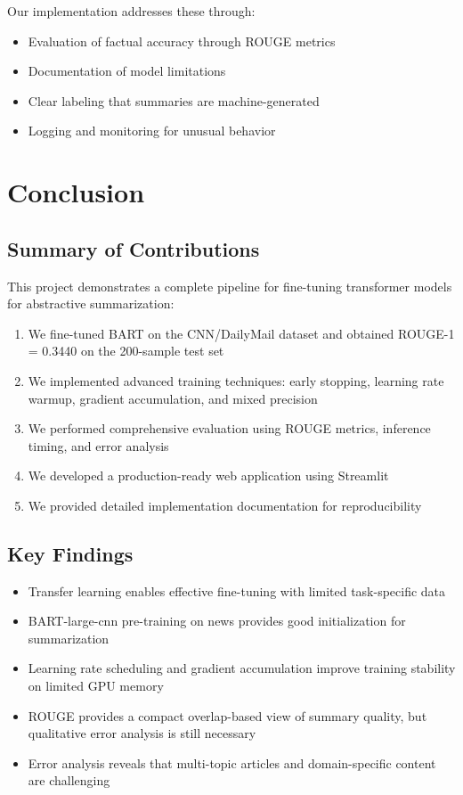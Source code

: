 \documentclass[12pt,a4paper,oneside]{report}
\begin{document}
Our implementation addresses these through:
\begin{itemize}
    \item Evaluation of factual accuracy through ROUGE metrics
    \item Documentation of model limitations
    \item Clear labeling that summaries are machine-generated
    \item Logging and monitoring for unusual behavior
\end{itemize}

\chapter{Conclusion}
\label{ch:conclusion}

\section{Summary of Contributions}
This project demonstrates a complete pipeline for fine-tuning transformer models for abstractive summarization:

\begin{enumerate}
    \item We fine-tuned BART on the CNN/DailyMail dataset and obtained ROUGE-1 = 0.3440 on the 200-sample test set
    \item We implemented advanced training techniques: early stopping, learning rate warmup, gradient accumulation, and mixed precision
    \item We performed comprehensive evaluation using ROUGE metrics, inference timing, and error analysis
    \item We developed a production-ready web application using Streamlit
    \item We provided detailed implementation documentation for reproducibility
\end{enumerate}

\section{Key Findings}
\begin{itemize}
    \item Transfer learning enables effective fine-tuning with limited task-specific data
    \item BART-large-cnn pre-training on news provides good initialization for summarization
    \item Learning rate scheduling and gradient accumulation improve training stability on limited GPU memory
    \item ROUGE provides a compact overlap-based view of summary quality, but qualitative error analysis is still necessary
    \item Error analysis reveals that multi-topic articles and domain-specific content are challenging
\end{itemize}
\end{document}
